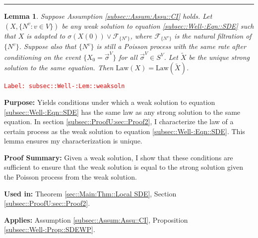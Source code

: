\documentclass[12pt]{article}
\newcommand{\mc}{\mathcal}
\newcommand{\te}{\text}
\newcommand{\tr}{\textcolor{red}}
\newcommand{\labe}[1]{\tr{\texttt{Label: #1}}}
\newcommand{\purpose}{\textbf{Purpose: }}
\newcommand{\pfsum}{\textbf{Proof Summary: }}
\newcommand{\usein}{\textbf{Used in: }}
\newcommand{\app}{\textbf{Applies: }}
\newcommand{\lin}{\rule{\linewidth}{0.4 pt}}
\renewcommand{\v}{v}							%
\renewcommand{\S}{S}							%
\newcommand{\s}{\sigma}							%
\newcommand{\sv}{\vec{\s}}						%
\newcommand{\F}{\mc{F}}							%
\newcommand{\X}{X}								%
\newcommand{\vind}[1]{^{#1}}					%
\newcommand{\carp}[1]{^{#1}}					%
\newcommand{\vsi}[1]{^{#1}}						%
\newcommand{\tp}[1]{(#1)}						%
\newcommand{\ts}[1]{_{#1}}						%
\newcommand{\poiss}{N}							%
\newcommand{\alt}[1]{\widetilde{#1}}			%
\newcommand{\pra}[1]{_{#1}}						%
\newcommand{\law}{\te{Law}}						%
\newtheorem{lem}[thms]{Lemma}
\begin{document}
\lin

\begin{lem}
Suppose Assumption \ref{subsec::Assum:Assu::CI} holds. Let \((\X,\{\poiss\vind{\v}:\v\in V\})\) be any weak solution to equation \eqref{subsec::Well-:Eqn::SDE} such that \(\X\) is adapted to \(\sigma(\X\tp{0})\vee\F\pra{\{\poiss\vind{\v}\}}\), where \(\F\pra{\{\poiss\vind{\v}\}}\) is the natural filtration of \(\{\poiss\vind{\v}\}\). Suppose also that \(\{\poiss\vind{\v}\}\) is still a Poisson process with the same rate after conditioning on the event \(\{\X\ts{0} = \sv\vsi{V}\}\) for all \(\sv\vsi{V} \in \S\carp{V}\). Let \(\alt{\X}\) be the unique strong solution to the same equation. Then \(\law(\X) = \law(\alt{\X})\).
\label{subsec::Well-:Lem::weaksoln}
\end{lem}
\labe{subsec::Well-:Lem::weaksoln}

\purpose Yields conditions under which a weak solution to equation \eqref{subsec::Well-:Eqn::SDE} has the same law as any strong solution to the same equation. In section \ref{subsec::ProofU:sec::Proof2}, I characterize the law of a certain process as the weak solution to equation \eqref{subsec::Well-:Eqn::SDE}. This lemma ensures my characterization is unique.

\pfsum Given a weak solution, I show that these conditions are sufficient to ensure that the weak solution is equal to the strong solution given the Poisson process from the weak solution.

\usein Theorem \ref{sec::Main:Thm::Local SDE}, Section \ref{subsec::ProofU:sec::Proof2}.

\app Assumption \ref{subsec::Assum:Assu::CI}, Proposition \ref{subsec::Well-:Prop::SDEWP}.
\end{document}
